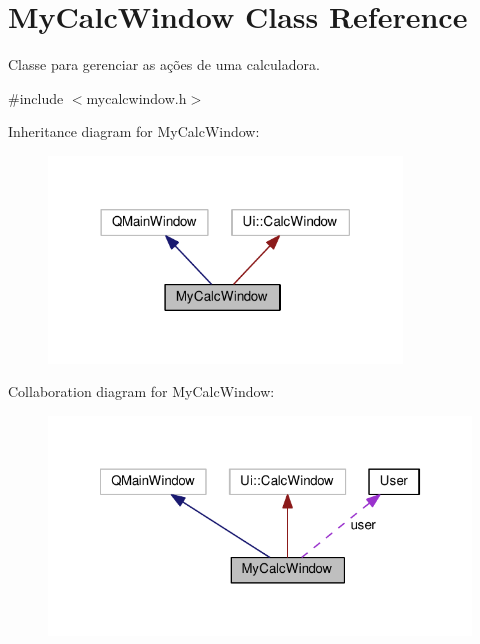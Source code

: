 \hypertarget{classMyCalcWindow}{}\section{My\+Calc\+Window Class Reference}
\label{classMyCalcWindow}


Classe para gerenciar as ações de uma calculadora.  




{\ttfamily \#include $<$mycalcwindow.\+h$>$}



Inheritance diagram for My\+Calc\+Window\+:
\nopagebreak
\begin{figure}[H]
\begin{center}
\leavevmode
\includegraphics[width=266pt]{d9/d04/classMyCalcWindow__inherit__graph}
\end{center}
\end{figure}


Collaboration diagram for My\+Calc\+Window\+:
\nopagebreak
\begin{figure}[H]
\begin{center}
\leavevmode
\includegraphics[width=322pt]{d6/dbc/classMyCalcWindow__coll__graph}
\end{center}
\end{figure}
